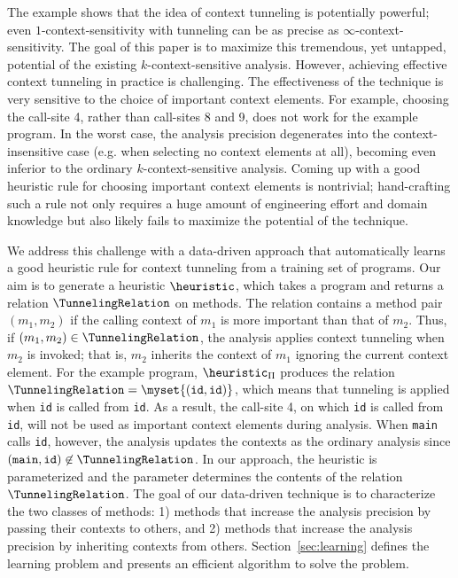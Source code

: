 The example shows that the idea of context tunneling is potentially
powerful; even $1$-context-sensitivity with
tunneling can be as precise as
$\infty$-context-sensitivity. The goal of this paper is to maximize
this tremendous, yet untapped, potential of the existing $k$-context-sensitive analysis.
However, achieving effective context tunneling in practice is
challenging. The effectiveness of the technique is very sensitive
to the choice of important context elements.  For example,
choosing the call-site 4, rather than call-sites 8 and 9, does not
work for the example program.  In the worst case, the analysis
precision degenerates into the context-insensitive case (e.g. when
selecting no context elements at all), becoming even inferior to the
ordinary
$k$-context-sensitive analysis.  Coming up with a good
heuristic rule for choosing important context elements is nontrivial;
hand-crafting such a rule not only requires a huge amount of
engineering effort and domain knowledge but also likely fails to
maximize the potential of the technique.




We address this challenge with a data-driven approach that
automatically learns a good heuristic rule for context tunneling from
a training set of programs.
Our aim is to generate a heuristic $\heuristic$,
which takes a program and returns a relation $\TunnelingRelation$ on
methods.  The relation contains a method pair $(m_1, m_2)$ if the
calling context of $m_1$ is more important than that of $m_2$. Thus,
if $(m_1, m_2) \in \TunnelingRelation$, the analysis applies context
tunneling when $m_2$ is invoked; that is, $m_2$ inherits the context
of $m_1$ ignoring the current context element. For the example
program, $\heuristic_\Pi$ produces the relation
$\TunnelingRelation = \myset{({\tt id}, {\tt id})}$, which means that
tunneling is applied when {\tt id} is called from {\tt id}. As a
result, the call-site 4, on which {\tt id} is called from {\tt id},
will not be used as important context elements during analysis.  When
{\tt main} calls {\tt id}, however, the analysis updates the contexts
as the ordinary analysis since
$({\tt main}, {\tt id}) \not\in \TunnelingRelation$.  In our approach,
the heuristic is parameterized and the parameter determines the
contents of the relation $\TunnelingRelation$.  The goal of our
data-driven technique is to characterize the two classes of methods:
1) methods that increase the analysis precision by passing their
contexts to others, and 2) methods that increase the analysis
precision by inheriting contexts from others.
Section~\ref{sec:learning} defines the learning problem and presents an efficient
algorithm to solve the problem.

